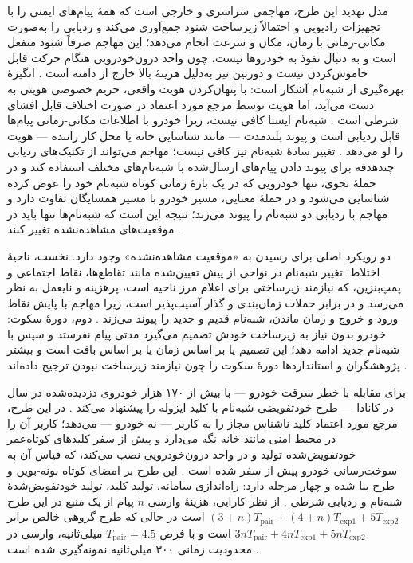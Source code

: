 مدل تهدید این طرح، مهاجمی سراسری و خارجی است که همهٔ پیام‌های ایمنی را با تجهیزات رادیویی و احتمالاً زیرساخت شنود جمع‌آوری می‌کند و ردیابی را به‌صورت مکانی-زمانی با زمان، مکان و سرعت انجام می‌دهد؛ این مهاجم صرفاً شنود منفعل است و به دنبال نفوذ به خودروها نیست، چون واحد درون‌خودرویی هنگام حرکت قابل خاموش‌کردن نیست و دوربین نیز به‌دلیل هزینهٔ بالا خارج از دامنه است \cite{luPseudonymChangingSocial2012}. انگیزهٔ بهره‌گیری از شبه‌نام آشکار است: با پنهان‌کردن هویت واقعی، حریم خصوصی هویتی به دست می‌آید، اما هویت توسط مرجع مورد اعتماد در صورت اختلاف قابل افشای شرطی است \cite{luPseudonymChangingSocial2012}. شبه‌نام ایستا کافی نیست، زیرا خودرو با اطلاعات مکانی-زمانی پیام‌ها قابل ردیابی است و پیوند بلندمدت — مانند شناسایی خانه یا محل کار راننده — هویت را لو می‌دهد \cite{luPseudonymChangingSocial2012}. تغییر سادهٔ شبه‌نام نیز کافی نیست؛ مهاجم می‌تواند از تکنیک‌های ردیابی چندهدفه برای پیوند دادن پیام‌های ارسال‌شده با شبه‌نام‌های مختلف استفاده کند و در حملهٔ نحوی، تنها خودرویی که در یک بازهٔ زمانی کوتاه شبه‌نام خود را عوض کرده شناسایی می‌شود و در حملهٔ معنایی، مسیر خودرو با مسیر همسایگان تفاوت دارد و مهاجم با ردیابی دو شبه‌نام را پیوند می‌زند؛ نتیجه این است که شبه‌نام‌ها تنها باید در موقعیت‌های مشاهده‌نشده تغییر کنند \cite{luPseudonymChangingSocial2012}.

دو رویکرد اصلی برای رسیدن به «موقعیت مشاهده‌نشده» وجود دارد. نخست، ناحیهٔ اختلاط: تغییر شبه‌نام در نواحی از پیش تعیین‌شده مانند تقاطع‌ها، نقاط اجتماعی و پمپ‌بنزین، که نیازمند زیرساختی برای اعلام مرز ناحیه است، پرهزینه و نایعمل به نظر می‌رسد و در برابر حملات زمان‌بندی و گذار آسیب‌پذیر است، زیرا مهاجم با پایش نقاط ورود و خروج و زمان ماندن، شبه‌نام قدیم و جدید را پیوند می‌زند \cite{luPseudonymChangingSocial2012}. دوم، دورهٔ سکوت: خودرو بدون نیاز به زیرساخت خودش تصمیم می‌گیرد مدتی پیام نفرستد و سپس با شبه‌نام جدید ادامه دهد؛ این تصمیم یا بر اساس زمان یا بر اساس بافت است و بیشتر پژوهشگران و استانداردها دورهٔ سکوت را چون نیازمند زیرساخت نبودن ترجیح داده‌اند \cite{luPseudonymChangingSocial2012}.

برای مقابله با خطر سرقت خودرو — با بیش از ۱۷۰ هزار خودروی دزدیده‌شده در سال در کانادا — طرح خودتفویضی شبه‌نام با کلید ایزوله  را پیشنهاد می‌کند \cite{luPseudonymChangingSocial2012}. در این طرح، مرجع مورد اعتماد کلید ناشناس مجاز را به کاربر — نه خودرو — می‌دهد؛ کاربر آن را در محیط امنی مانند خانه نگه می‌دارد و پیش از سفر کلیدهای کوتاه‌عمر خودتفویض‌شده تولید و در واحد درون‌خودرویی نصب می‌کند، که قیاس آن به سوخت‌رسانی خودرو پیش از سفر شده است \cite{luPseudonymChangingSocial2012}. این طرح بر امضای کوتاه بونه-بوین و طرح  بنا شده و چهار مرحله دارد: راه‌اندازی سامانه، تولید کلید، تولید خودتفویض‌شدهٔ شبه‌نام و ردیابی شرطی \cite{luPseudonymChangingSocial2012}. از نظر کارایی، هزینهٔ وارسی $n$ پیام از یک منبع در این طرح $(3+n)T_{\mathrm{pair}} + (4+n)T_{\mathrm{exp1}} + 5T_{\mathrm{exp2}}$ است در حالی که طرح گروهی خالص  برابر $3nT_{\mathrm{pair}} + 4nT_{\mathrm{exp1}} + 5nT_{\mathrm{exp2}}$ است و با فرض $T_{\mathrm{pair}} = 4.5$ میلی‌ثانیه، وارسی در محدودیت زمانی ۳۰۰ میلی‌ثانیه نمونه‌گیری شده است \cite{luPseudonymChangingSocial2012}.

